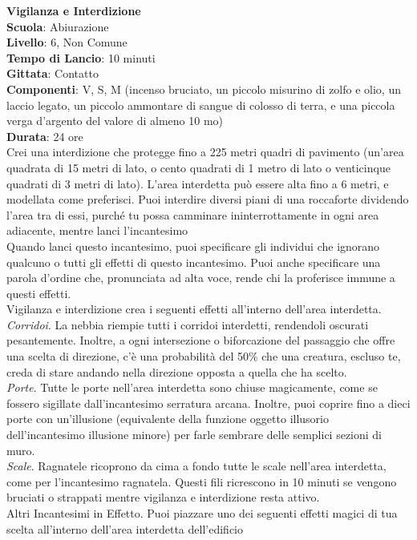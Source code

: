 \begin{multicols}{2}
\medskip\textbf{Vigilanza e Interdizione}\\
\textbf{Scuola}: Abiurazione\\
\textbf{Livello}: 6, Non Comune\\
\textbf{Tempo di Lancio}: 10 minuti\\
\textbf{Gittata}: Contatto\\
\textbf{Componenti}: V, S, M (incenso bruciato, un piccolo misurino di zolfo e olio, un laccio legato, un piccolo ammontare di sangue di colosso di terra, e una piccola verga d'argento del valore di almeno 10 mo)\\
\textbf{Durata}: 24 ore\\
Crei una interdizione che protegge fino a 225 metri quadri di pavimento (un'area quadrata di 15 metri di lato, o cento quadrati di 1 metro di lato o venticinque quadrati di 3 metri di lato). L'area interdetta può essere alta fino a 6 metri, e modellata come preferisci. Puoi interdire diversi piani di una roccaforte dividendo l'area tra di essi, purché tu possa camminare ininterrottamente in ogni area adiacente, mentre lanci l'incantesimo\\
Quando lanci questo incantesimo, puoi specificare gli individui che ignorano qualcuno o tutti gli effetti di questo incantesimo. Puoi anche specificare una parola d'ordine che, pronunciata ad alta voce, rende chi la proferisce immune a questi effetti.\\
Vigilanza e interdizione crea i seguenti effetti all'interno dell'area interdetta.\\
\textit{Corridoi}. La nebbia riempie tutti i corridoi interdetti, rendendoli oscurati pesantemente. Inoltre, a ogni intersezione o biforcazione del passaggio che offre una scelta di direzione, c'è una probabilità del 50\% che una creatura, escluso te, creda di stare andando nella direzione opposta a quella che ha scelto.\\
\textit{Porte}. Tutte le porte nell'area interdetta sono chiuse magicamente, come se fossero sigillate dall'incantesimo serratura arcana. Inoltre, puoi coprire fino a dieci porte con un'illusione (equivalente della funzione oggetto illusorio dell'incantesimo illusione minore) per farle sembrare delle semplici sezioni di muro.\\
\textit{Scale}. Ragnatele ricoprono da cima a fondo tutte le scale nell'area interdetta, come per l'incantesimo ragnatela. Questi fili ricrescono in 10 minuti se vengono bruciati o strappati mentre vigilanza e interdizione resta attivo.\\
Altri Incantesimi in Effetto. Puoi piazzare uno dei seguenti effetti magici di tua scelta all'interno dell'area interdetta dell'edificio\\


\end{multicols}
